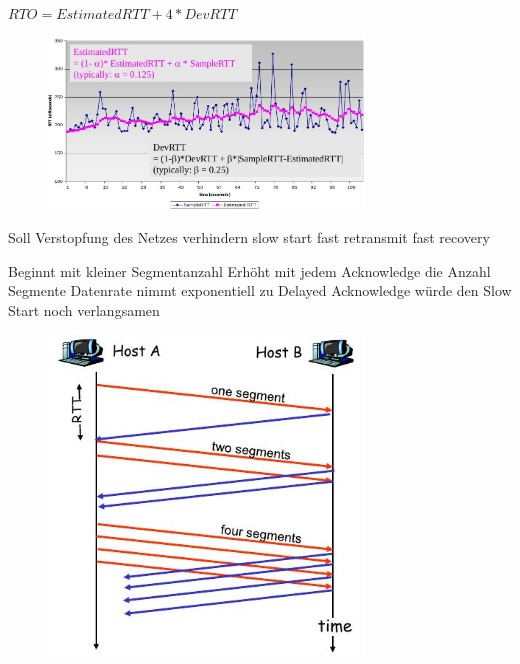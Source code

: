 \documentclass[ngerman,a4paper,12pt]{scrreprt}
\begin{document}
$RTO = EstimatedRTT + 4* DevRTT$

\begin{figure}[H]
	\centering
	\includegraphics[width=0.75\textwidth]{img/V12.6.jpg}
	\caption{}
	\label{}
\end{figure}

\ul
	\li Soll Verstopfung des Netzes verhindern
	\li slow start
	\li fast retransmit
	\li fast recovery
\ulE

\ul
	\li Beginnt mit kleiner Segmentanzahl
	\li Erhöht mit jedem Acknowledge die Anzahl Segmente
	\li Datenrate nimmt exponentiell zu
	\li Delayed Acknowledge würde den Slow Start noch verlangsamen
\ulE

\begin{figure}[H]
	\centering
	\includegraphics[width=0.75\textwidth]{img/V12.7.jpg}
	\caption{}
	\label{}
\end{figure}
\end{document}
